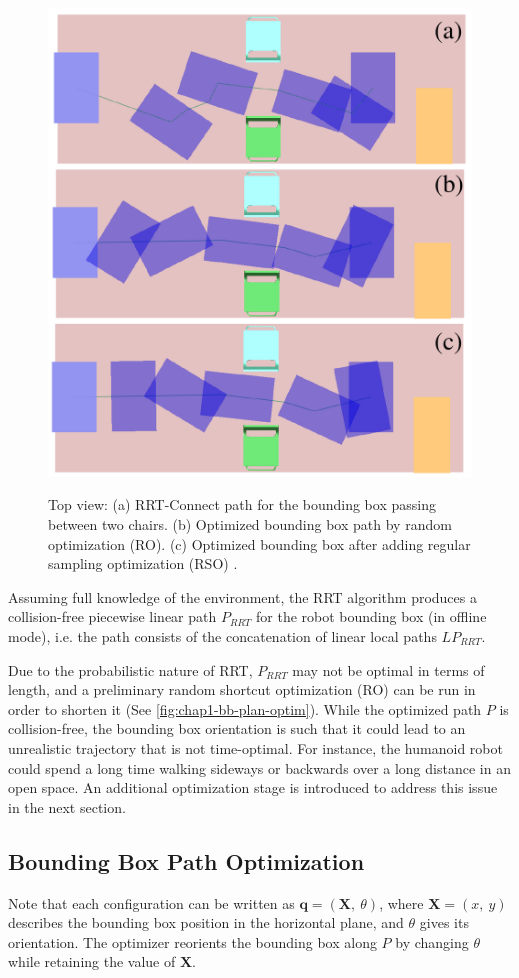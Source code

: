 \begin{figure}
  \centering
      {\includegraphics[width = 0.8\linewidth]
        {src/chap1-path-optimization/bb-plan-optim.pdf}}
      \caption{Top view: (a) RRT-Connect path for the bounding box
        passing between two chairs. (b) Optimized bounding box path by
        random optimization (RO). (c) Optimized bounding box after
        adding regular sampling optimization (RSO) .}
      \label{fig:chap1-bb-plan-optim}
\end{figure}

Assuming full knowledge of the environment, the RRT algorithm produces
a collision-free piecewise linear path $P_{RRT}$ for the robot
bounding box (in offline mode), i.e. the path consists of the
concatenation of linear local paths $LP_{RRT}$.

Due to the probabilistic nature of RRT, $P_{RRT}$ may not be optimal
in terms of length, and a preliminary random shortcut optimization
(RO) can be run in order to shorten it (See
\autoref{fig:chap1-bb-plan-optim}). While the optimized path $P$ is
collision-free, the bounding box orientation is such that it could
lead to an unrealistic trajectory that is not time-optimal. For
instance, the humanoid robot could spend a long time walking sideways
or backwards over a long distance in an open space. An additional
optimization stage is introduced to address this issue in the next
section.

\subsection{Bounding Box Path Optimization}
Note that each configuration \config{} can be written as $\mathbf{q} =
(\mathbf{X},~\theta)$, where $\mathbf{X} = (x,~y)$ describes the
bounding box position in the horizontal plane, and $\theta$ gives its
orientation.  The optimizer reorients the bounding box along $P$ by
changing $\theta$ while retaining the value of $\mathbf{X}$.

